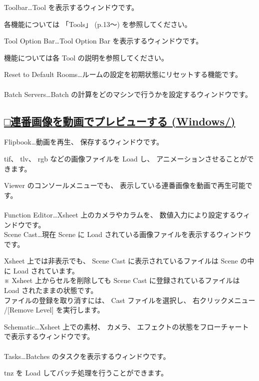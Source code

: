 \documentclass[a4paper,10pt]{article}
\begin{document}
\normalsize
\noindent Toolbar…Tool を表示するウィンドウです。\par
\footnotesize
\noindent 各機能については 「Tools」 (p.13～) を参照してください。\\[-0.5em]
\par
\normalsize
\noindent Tool Option Bar…Tool Option Bar を表示するウィンドウです。\par
\footnotesize
\noindent 機能については各 Tool の説明を参照してください。\\[-0.5em]
\par
\normalsize
\noindent Reset to Default Rooms…ルームの設定を初期状態にリセットする機能です。\\[-0.5em]
\\
Batch Servers…Batch の計算をどのマシンで行うかを設定するウィンドウです。

\newpage

\subsection*{\uline{□連番画像を動画でプレビューする (Windows/)}}

\normalsize
\noindent Flipbook…動画を再生、 保存するウィンドウです。\par
\footnotesize
\noindent tif、 tlv、 rgb などの画像ファイルを Load し、 アニメーションさせることができます。\\
\par
\normalsize
\noindent Viewer のコンソールメニューでも、 表示している連番画像を動画で再生可能です。\\
\\
Function Editor…Xsheet 上のカメラやカラムを、 数値入力により設定するウィンドウです。\\[1em]
Scene Cast…現在 Scene に Load されている画像ファイルを表示するウィンドウです。\par
\footnotesize
\noindent Xsheet 上では非表示でも、 Scene Cast に表示されているファイルは Scene の中に Load されています。\\
※ Xsheet 上からセルを削除しても Scene Cast に登録されているファイルは Load されたままの状態です。\\
ファイルの登録を取り消すには、 Cast ファイルを選択し、 右クリックメニュー /[Remove Level] を実行します。\\
\par
\normalsize
\noindent Schematic…Xsheet 上での素材、 カメラ、 エフェクトの状態をフローチャートで表示するウィンドウです。\\
\\
Tasks…Batches のタスクを表示するウィンドウです。\par
\footnotesize
\noindent tnz を Load してバッチ処理を行うことができます。\\
\\
\end{document}

